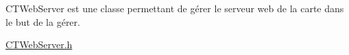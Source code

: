 CTWeb\+Server est une classe permettant de gérer le serveur web de la carte dans le but de la gérer.

\mbox{\hyperlink{_c_t_web_server_8h}{CTWeb\+Server.\+h}} 